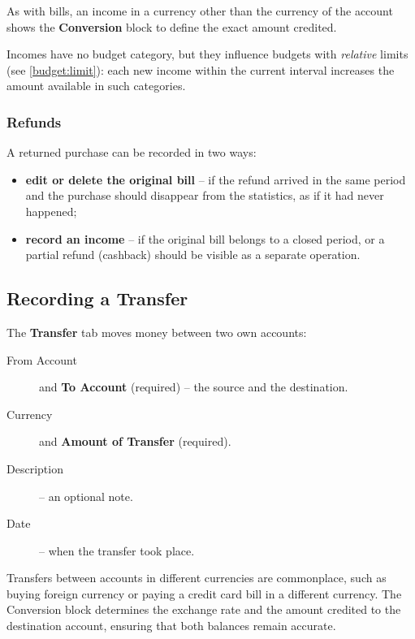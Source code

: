 \noindent As with bills, an income in a currency other than the currency of the account shows
the \textbf{Conversion} block to define the exact amount credited.

Incomes have no budget category, but they influence budgets with \emph{relative} limits (see
\cref{budget:limit}): each new income within the current interval increases the amount
available in such categories.


\subsubsection{Refunds}

A returned purchase can be recorded in two ways:

\begin{itemize}
  \item \textbf{edit or delete the original bill} -- if the refund arrived in the same period
  and the purchase should disappear from the statistics, as if it had never happened;
  \item \textbf{record an income} -- if the original bill belongs to a closed period, or a
  partial refund (cashback) should be visible as a separate operation.
\end{itemize}


\subsection{Recording a Transfer}

The \textbf{Transfer} tab moves money between two own accounts:

\begin{description}
  \item[From Account] and \textbf{To Account} (required) -- the source and the destination.
  \item[Currency] and \textbf{Amount of Transfer} (required).
  \item[Description] -- an optional note.
  \item[Date] -- when the transfer took place.
\end{description}

\noindent Transfers between accounts in different currencies are commonplace, such as buying
foreign currency or paying a credit card bill in a different currency. The Conversion block
determines the exchange rate and the amount credited to the destination account, ensuring
that both balances remain accurate.

